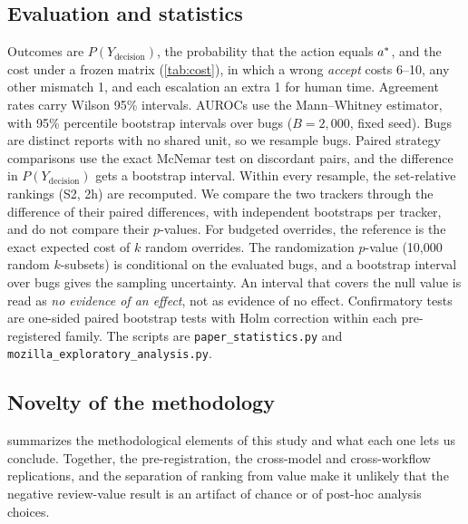 \subsection{Evaluation and statistics}
Outcomes are $P(Y_{\text{decision}})$, the probability that the action
equals $a^{*}$, and the cost under a frozen matrix (\cref{tab:cost}),
in which a wrong \emph{accept} costs 6--10, any other mismatch 1, and
each escalation an extra 1 for human time. Agreement rates carry Wilson
95\% intervals. AUROCs use the Mann--Whitney estimator, with 95\%
percentile bootstrap intervals over bugs ($B = 2{,}000$, fixed seed).
Bugs are distinct reports with no shared unit, so we resample bugs.
Paired strategy comparisons use the exact McNemar test on discordant
pairs, and the difference in $P(Y_{\text{decision}})$ gets a bootstrap
interval. Within every resample, the set-relative rankings (S2, 2h) are
recomputed. We compare the two trackers through the difference of their
paired differences, with independent bootstraps per tracker, and do not
compare their $p$-values. For budgeted overrides, the reference is the
exact expected cost of $k$ random overrides. The randomization
$p$-value (10{,}000 random $k$-subsets) is conditional on the evaluated
bugs, and a bootstrap interval over bugs gives the sampling uncertainty.
An interval that covers the null value is read as \emph{no evidence of
an effect}, not as evidence of no effect. Confirmatory tests are
one-sided paired bootstrap tests with Holm correction within each
pre-registered family. The scripts are \texttt{paper\_statistics.py} and
\texttt{mozilla\_exploratory\_analysis.py}.

\subsection{Novelty of the methodology}
\label{sec:novelty}
 summarizes the methodological elements of this study
and what each one lets us conclude. Together, the pre-registration, the
cross-model and cross-workflow replications, and the separation of
ranking from value make it unlikely that the negative review-value
result is an artifact of chance or of post-hoc analysis choices.

